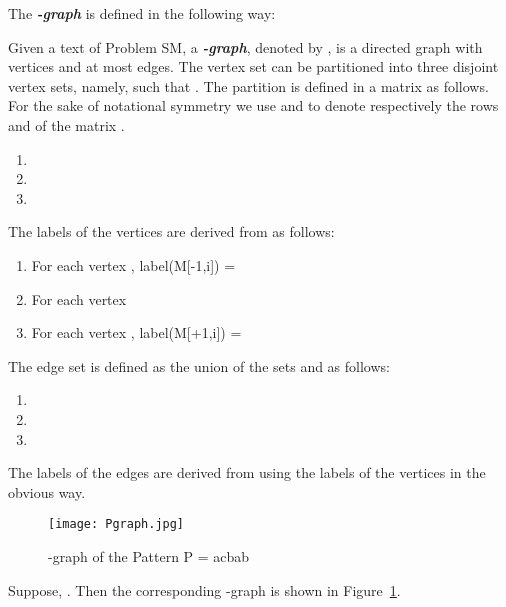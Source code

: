 \documentclass{llncs}
\begin{document}
\begin{definition}


The \textbf{\emph{-graph}} is defined in the following way:



Given a text  of Problem SM, a
\textbf{\emph{-graph}}, denoted by ,
is a directed graph with  vertices and at most  edges.
The vertex set  can be partitioned into three disjoint vertex
sets, namely,  such that . The partition
is defined in a  matrix  as follows. For the sake
of notational symmetry we use  and  to denote
respectively the rows  and  of the matrix .
\begin{enumerate}
\item 
\item 
\item 
\end{enumerate}
The labels of the vertices are derived from  as follows:



\begin{enumerate}
\item For each vertex ,
label(M[-1,i]) =  

\item For each vertex 
\item For each vertex ,
label(M[+1,i]) = 


\end{enumerate}

The edge set  is defined as the union of the sets  and  as follows:

\begin{enumerate}
\item 
\item 
\item 
\end{enumerate}

The labels of the edges are derived from using the labels of the
vertices in the obvious way.
\end{definition}


\begin{figure}[hbtp]
\begin{center}
\texttt{[image: Pgraph.jpg]}
\caption{-graph of the Pattern P = acbab} \label{Fig_P_Graph1}
\end{center}
\end{figure}



\begin{example}\label{Ex_P_Graph}
Suppose, . Then the corresponding -graph
 is shown in Figure~\ref{Fig_P_Graph1}.
\end{example}
\end{document}

